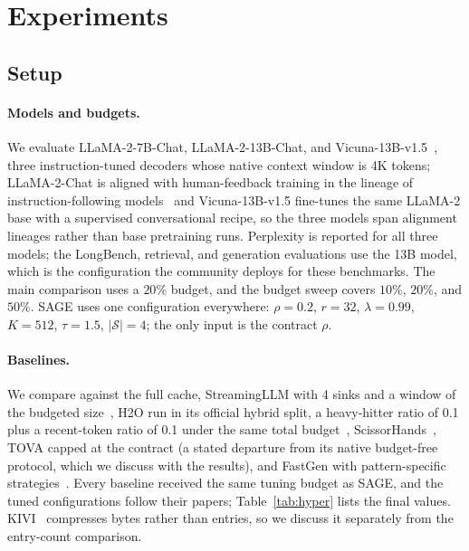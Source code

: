 \section{Experiments}\label{sec:exp}

\subsection{Setup}\label{sec:exp_setup}

\paragraph{Models and budgets.}
We evaluate LLaMA-2-7B-Chat, LLaMA-2-13B-Chat, and
Vicuna-13B-v1.5~\cite{touvron2023llama2,chiang2023vicuna}, three
instruction-tuned decoders whose native context window is 4K tokens;
LLaMA-2-Chat is aligned with human-feedback training in the lineage of
instruction-following models~\cite{ouyang2022training} and Vicuna-13B-v1.5
fine-tunes the same LLaMA-2 base with a supervised conversational
recipe, so the three models span alignment lineages rather than base
pretraining runs. Perplexity is reported for all three models; the
LongBench, retrieval, and generation evaluations use the 13B model,
which is the configuration the community deploys for these benchmarks.
The main comparison uses a $20\%$ budget, and the budget sweep covers
$10\%$, $20\%$, and $50\%$. SAGE uses one configuration everywhere:
$\rho = 0.2$, $r = 32$, $\lambda = 0.99$, $K = 512$, $\tau = 1.5$,
$|\mathcal{S}| = 4$; the only input is the contract $\rho$.

\paragraph{Baselines.}
We compare against the full cache, StreamingLLM with 4 sinks and a
window of the budgeted size~\cite{xiao2023efficient}, H2O run in its
official hybrid split, a heavy-hitter ratio of 0.1 plus a recent-token
ratio of 0.1 under the same total budget~\cite{zhang2023h2o},
ScissorHands~\cite{liu2023scissorhands}, TOVA capped at the contract
(a stated departure from its native budget-free protocol, which we
discuss with the results), and FastGen with pattern-specific
strategies~\cite{ge2023model}. Every baseline received the same tuning
budget as SAGE, and the tuned configurations follow their papers;
Table~\ref{tab:hyper} lists the final values.
KIVI~\cite{liu2024kivi} compresses bytes rather than entries, so we
discuss it separately from the entry-count comparison.

